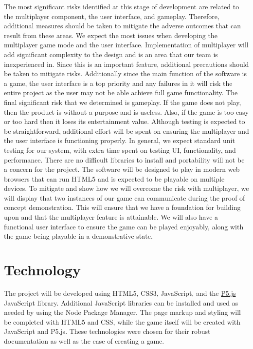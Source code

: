 \documentclass{article}
\begin{document}
The most significant risks identified at this stage of development are related to the multiplayer component, the user interface, and gameplay. Therefore, additional measures should be taken to mitigate the adverse outcomes that can result from these areas.
\bigskip
We expect the most issues when developing the multiplayer game mode and the user interface. Implementation of multiplayer will add significant complexity to the design and is an area that our team is inexperienced in. Since this is an important feature, additional precautions should be taken to mitigate risks. Additionally since the main function of the software is a game, the user interface is a top priority and any failures in it will risk the entire project as the user may not be able achieve full game functionality. The final significant risk that we determined is gameplay. If the game does not play, then the product is without a purpose and is useless. Also, if the game is too easy or too hard then it loses its entertainment value.
\bigskip
Although testing is expected to be straightforward, additional effort will be spent on ensuring the multiplayer and the user interface is functioning properly. In general, we expect standard unit testing for our system, with extra time spent on testing UI, functionality, and performance.
\bigskip
There are no difficult libraries to install and portability will not be a concern for the project. The software will be designed to play in modern web browsers that can run HTML5 and is expected to be playable on multiple devices.
\bigskip
To mitigate and show how we will overcome the risk with multiplayer, we will display that two instances of our game can communicate during the proof of concept demonstration. This will ensure that we have a foundation for building upon and that the multiplayer feature is attainable. We will also have a functional user interface to ensure the game can be played enjoyably, along with the game being playable in a demonstrative state.

\section{Technology}
The project will be developed using HTML5, CSS3, JavaScript, and the \href{https://p5js.org/}{P5.js} JavaScript library. Additional JavaScript libraries can be installed and used as needed by using the Node Package Manager. The page markup and styling will be completed with HTML5 and CSS, while the game itself will be created with JavaScript and P5.js. These technologies were chosen for their robust documentation as well as the ease of creating a game.
\end{document}
